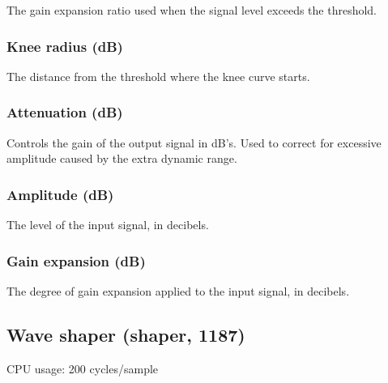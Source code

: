 \documentclass[11pt]{article}
\begin{document}
The gain expansion ratio used when the signal level exceeds the threshold.\subsubsection*{Knee radius (dB)}
The distance from the threshold where the knee curve starts.\subsubsection*{Attenuation (dB)}
Controls the gain of the output signal in dB's. Used to correct for excessive amplitude caused by the extra dynamic range.\subsubsection*{Amplitude (dB)}
The level of the input signal, in decibels.\subsubsection*{Gain expansion (dB)}
The degree of gain expansion applied to the input signal, in decibels.\subsection{Wave shaper (shaper, 1187)\label{shaper}\label{id1187}}
CPU usage: 200 cycles/sample
\end{document}
